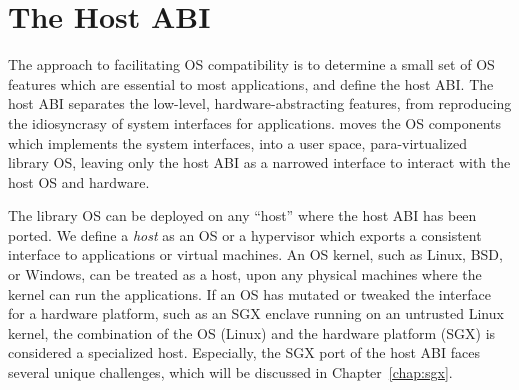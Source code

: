\section{The Host ABI}
\label{sec:overview:host}


The \graphene{} approach to facilitating OS compatibility is to determine a small set of OS features which are essential to most applications, and define the host ABI.
The host ABI separates the low-level, hardware-abstracting features, from reproducing the idiosyncrasy of system interfaces for applications. 
\graphene{} moves the OS components which implements the system interfaces,
into a user space, para-virtualized library OS,
leaving only the host ABI as a narrowed interface to interact with the host OS and hardware.




 

The \graphene{} library OS can be deployed on any ``host'' where the host ABI has been ported.
We define a {\em host} as an OS or a hypervisor which exports a consistent interface to applications or virtual machines.
An OS kernel, such as Linux, BSD, or Windows, can be treated as a host, upon any physical machines where the kernel can run the applications.
If an OS has mutated or tweaked the interface for a hardware platform,
such as an SGX enclave 
running on an untrusted Linux kernel,
the combination of the OS (Linux) and the hardware platform (SGX) is considered a specialized host.
Especially, the SGX port of the host ABI faces several unique challenges,
which will be discussed in Chapter~\ref{chap:sgx}.



